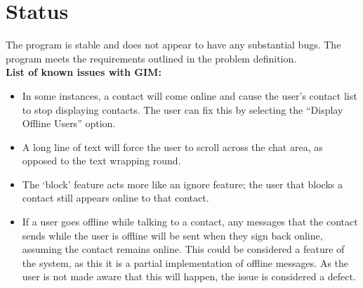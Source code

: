 \documentclass{article}
\begin{document}
\section{Status}

The program is stable and does not appear to have any substantial bugs. The program meets the requirements outlined in the problem definition. \\

{\bf List of known issues with GIM:}
\begin{itemize}

\item{In some instances, a contact will come online and cause the user's contact list to stop displaying contacts. The user can fix this by selecting the ``Display Offline Users'' option.}

\item{A long line of text will force the user to scroll across the chat area, as opposed to the text wrapping round.}

\item{The `block' feature acts more like an ignore feature; the user that blocks a contact still appears online to that contact.}

\item{If a user goes offline while talking to a contact, any messages that the contact sends while the user is offline will be sent when they sign back online, assuming the contact remains online. This could be considered a feature of the system, as this it is a partial implementation of offline messages. As the user is not made aware that this will happen, the issue is considered a defect.}

\end{itemize}
\end{document}
